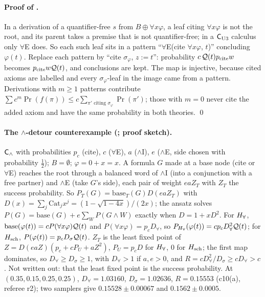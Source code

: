 \paragraph{Proof of .} In a derivation of a quantifier-free $s$ from $B\oplus\forall x\varphi$, a leaf citing $\forall x\varphi$ is not the root, and its parent takes a premise that is not quantifier-free; in a $\mathsf{C}_{\mathrm{U3}}$ calculus only $\forall$E does. So each such leaf sits in a pattern ``$\forall$E(cite $\forall x\varphi$, $t$)'' concluding $\varphi(t)$. Replace each pattern by ``cite $\sigma_\varphi$, $z:=t$'': probability $c\,\mathcal{Q}(t)p_{\mathrm{cite}}w$ becomes $p_{\mathrm{cite}}w\mathcal{Q}(t)$, and conclusions are kept. The map is injective, because cited axioms are labelled and every $\sigma_\varphi$-leaf in the image came from a pattern. Derivations with $m\ge1$ patterns contribute $\sum c^m\Pr(f(\pi))\le c\sum_{\pi'\text{ citing }\sigma_\varphi}\Pr(\pi')$; those with $m=0$ never cite the added axiom and have the same probability in both theories. \qed

\paragraph{The $\wedge$-detour counterexample (; proof sketch).}\label{app:univ:detour} $\mathsf{C}_{\wedge}$ with probabilities $p_c$ (cite), $c$ ($\forall$E), $a$ ($\wedge$I), $e$ ($\wedge$E, side chosen with probability $\tfrac12$); $B=\emptyset$; $\varphi=0+x=x$. A formula $G$ made at a base node (cite or $\forall$E) reaches the root through a balanced word of $\wedge$I (into a conjunction with a free partner) and $\wedge$E (take $G$'s side), each pair of weight $eaZ_T$ with $Z_T$ the success probability. So $P_T(G)=\mathrm{base}_T(G)D(eaZ_T)$ with $D(x)=\sum_j\mathrm{Cat}_jx^j=(1-\sqrt{1-4x})/(2x)$; the ansatz solves $P(G)=\mathrm{base}(G)+e\sum_WP(G\wedge W)$ exactly when $D=1+xD^2$. For $H_{\forall}$, $\mathrm{base}(\varphi(t))=cP(\forall x\varphi)\mathcal{Q}(t)$ and $P(\forall x\varphi)=p_cD_\forall$, so $P_{H_{\forall}}(\varphi(t))=cp_cD_\forall^2\mathcal{Q}(t)$; for $H_{\mathrm{sch}}$, $P(\varphi(t))=p_cD_\sigma\mathcal{Q}(t)$. $Z_T$ is the least fixed point of $Z=D(eaZ)(p_c+cP_U+aZ^2)$, $P_U=p_cD$ for $H_{\forall}$, $0$ for $H_{\mathrm{sch}}$; the first map dominates, so $D_\forall\ge D_\sigma\ge1$, with $D_\forall>1$ if $a,e>0$, and $R=cD_\forall^2/D_\sigma\ge cD_\forall>c$. Not written out: that the least fixed point is the success probability. At $(0.35,0.15,0.25,0.25)$, $D_\forall=1.03160$, $D_\sigma=1.02636$, $R=0.15553$ (c10(a), referee r2); two samplers give $0.15528\pm0.00067$ and $0.1562\pm0.0005$.


